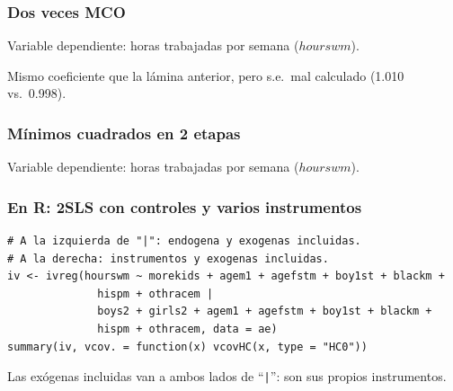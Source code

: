 \documentclass[t, compress, spanish, aspectratio=169]{beamer}
\begin{document}
\begin{frame}
	\frametitle{Dos veces MCO}
	Variable dependiente: horas trabajadas por semana ($hourswm$).
	\begin{center}
	\footnotesize\renewcommand{\arraystretch}{0.9}
	
	\end{center}
	\small
	Mismo coeficiente que la l\'amina anterior, pero s.e.\ mal calculado (1.010 vs.\ 0.998).
\end{frame}

\begin{frame}
	\frametitle{M\'inimos cuadrados en 2 etapas}
	Variable dependiente: horas trabajadas por semana ($hourswm$).
	\begin{center}
	\footnotesize\renewcommand{\arraystretch}{0.9}
	
	\end{center}
\end{frame}
\begin{frame}[fragile]
	\frametitle{En R: 2SLS con controles y varios instrumentos}
\footnotesize
\begin{verbatim}
# A la izquierda de "|": endogena y exogenas incluidas.
# A la derecha: instrumentos y exogenas incluidas.
iv <- ivreg(hourswm ~ morekids + agem1 + agefstm + boy1st + blackm +
              hispm + othracem |
              boys2 + girls2 + agem1 + agefstm + boy1st + blackm +
              hispm + othracem, data = ae)
summary(iv, vcov. = function(x) vcovHC(x, type = "HC0"))
\end{verbatim}
\small
Las ex\'ogenas incluidas van a ambos lados de ``\texttt{|}'': son sus propios instrumentos.
\end{frame}
\end{document}
